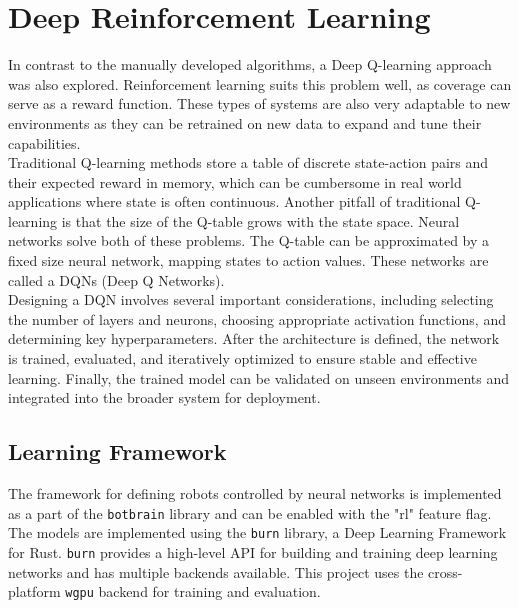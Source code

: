 \section{Deep Reinforcement Learning}
\label{sec:rl}
In contrast to the manually developed algorithms, a Deep Q-learning approach was also explored. Reinforcement learning suits this problem well, as coverage can serve as a reward function. These types of systems are also very adaptable to new environments as they can be retrained on new data to expand and tune their capabilities. \\

Traditional Q-learning methods store a table of discrete state-action pairs and their expected reward in memory, which can be cumbersome in real world applications where state is often continuous. Another pitfall of traditional Q-learning is that the size of the Q-table grows with the state space. Neural networks solve both of these problems. The Q-table can be approximated by a fixed size neural network, mapping states to action values. These networks are called a DQNs (Deep Q Networks). \\

Designing a DQN involves several important considerations, including selecting the number of layers and neurons, choosing appropriate activation functions, and determining key hyperparameters. After the architecture is defined, the network is trained, evaluated, and iteratively optimized to ensure stable and effective learning. Finally, the trained model can be validated on unseen environments and integrated into the broader system for deployment.


\subsection{Learning Framework}
The framework for defining robots controlled by neural networks is implemented as a part of the \texttt{botbrain} library and can be enabled with the "rl" feature flag. The models are implemented using the \texttt{burn} \cite{burn} library, a Deep Learning Framework for Rust. \texttt{burn} provides a high-level API for building and training deep learning networks and has multiple backends available. This project uses the cross-platform \texttt{wgpu} backend \cite{wgpu} for training and evaluation. \\

